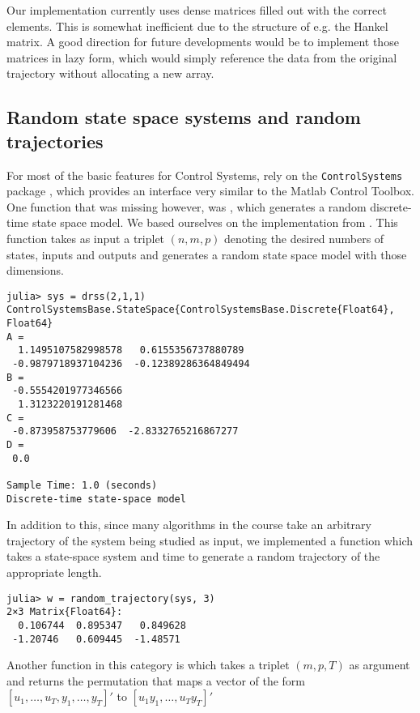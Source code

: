\documentclass[11pt]{article}
\begin{document}
Our implementation currently uses dense matrices filled out with the correct elements. This is somewhat inefficient due to the structure of e.g. the Hankel matrix. A good direction for future developments would be to implement those matrices in lazy form, which would simply reference the data from the original trajectory without allocating a new array. 

\subsection*{Random state space systems and random trajectories}
For most of the basic features for Control Systems, rely on the \texttt{ControlSystems} package \cite{controlsystems_jl}, which provides an interface very similar to the Matlab Control Toolbox. One function that was missing however, was , which generates a random discrete-time state space model. We based ourselves on the implementation from \cite{python-control}. This function takes as input a triplet $(n,m,p)$ denoting the desired numbers of states, inputs and outputs and generates a random state space model with those dimensions.

\begin{codebox}
\begin{verbatim}
julia> sys = drss(2,1,1)
ControlSystemsBase.StateSpace{ControlSystemsBase.Discrete{Float64}, Float64}
A = 
  1.1495107582998578   0.6155356737880789
 -0.9879718937104236  -0.12389286364849494
B = 
 -0.5554201977346566
  1.3123220191281468
C = 
 -0.873958753779606  -2.8332765216867277
D = 
 0.0

Sample Time: 1.0 (seconds)
Discrete-time state-space model
\end{verbatim}
\end{codebox}

In addition to this, since many algorithms in the course take an arbitrary trajectory of the system being studied as input, we implemented a function  which takes a state-space system and time to generate a random trajectory of the appropriate length.

\begin{codebox}
\begin{verbatim}
julia> w = random_trajectory(sys, 3)
2×3 Matrix{Float64}:
  0.106744  0.895347   0.849628
 -1.20746   0.609445  -1.48571
\end{verbatim}
\end{codebox}

Another function in this category is  which takes a triplet $(m,p,T)$ as argument and returns the permutation that maps a vector of the form $[u_1, \dots, u_T, y_1, \dots, y_T]'$ to $[u_1 y_1, \dots, u_T y_T]'$
\end{document}
